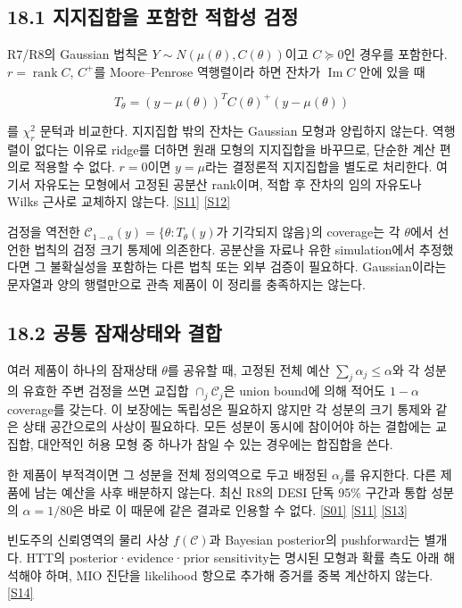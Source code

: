 \documentclass[11pt,a4paper]{article}
\begin{document}
\subsection*{18.1 지지집합을 포함한 적합성 검정}

R7/R8의 Gaussian 법칙은 \(Y\sim N(\mu(\theta),C(\theta))\)이고 \(C\succeq0\)인 경우를 포함한다. \(r=\operatorname{rank}C\), \(C^+\)를 Moore–Penrose 역행렬이라 하면 잔차가 \(\operatorname{Im}C\) 안에 있을 때


\[
T_\theta=(y-\mu(\theta))^TC(\theta)^+(y-\mu(\theta))
\]

를 \(\chi^2_r\) 문턱과 비교한다. 지지집합 밖의 잔차는 Gaussian 모형과 양립하지 않는다. 역행렬이 없다는 이유로 ridge를 더하면 원래 모형의 지지집합을 바꾸므로, 단순한 계산 편의로 적용할 수 없다. \(r=0\)이면 \(y=\mu\)라는 결정론적 지지집합을 별도로 처리한다. 여기서 자유도는 모형에서 고정된 공분산 rank이며, 적합 후 잔차의 임의 자유도나 Wilks 근사로 교체하지 않는다. \hyperlink{src:S11}{[S11]} \hyperlink{src:S12}{[S12]}


검정을 역전한 \(\mathcal C_{1-\alpha}(y)=\{\theta:T_\theta(y)\text{가 기각되지 않음}\}\)의 coverage는 각 \(\theta\)에서 선언한 법칙의 검정 크기 통제에 의존한다. 공분산을 자료나 유한 simulation에서 추정했다면 그 불확실성을 포함하는 다른 법칙 또는 외부 검증이 필요하다. Gaussian이라는 문자열과 양의 행렬만으로 관측 제품이 이 정리를 충족하지는 않는다.


\subsection*{18.2 공통 잠재상태와 결합}

여러 제품이 하나의 잠재상태 \(\theta\)를 공유할 때, 고정된 전체 예산 \(\sum_j\alpha_j\le\alpha\)와 각 성분의 유효한 주변 검정을 쓰면 교집합 \(\cap_j\mathcal C_j\)은 union bound에 의해 적어도 \(1-\alpha\) coverage를 갖는다. 이 보장에는 독립성은 필요하지 않지만 각 성분의 크기 통제와 같은 상태 공간으로의 사상이 필요하다. 모든 성분이 동시에 참이어야 하는 결합에는 교집합, 대안적인 허용 모형 중 하나가 참일 수 있는 경우에는 합집합을 쓴다.


한 제품이 부적격이면 그 성분을 전체 정의역으로 두고 배정된 \(\alpha_j\)를 유지한다. 다른 제품에 남는 예산을 사후 배분하지 않는다. 최신 R8의 DESI 단독 95\% 구간과 통합 성분의 \(\alpha=1/80\)은 바로 이 때문에 같은 결과로 인용할 수 없다. \hyperlink{src:S01}{[S01]} \hyperlink{src:S11}{[S11]} \hyperlink{src:S13}{[S13]}


빈도주의 신뢰영역의 물리 사상 \(f(\mathcal C)\)과 Bayesian posterior의 pushforward는 별개다. HTT의 posterior·evidence·prior sensitivity는 명시된 모형과 확률 측도 아래 해석해야 하며, MIO 진단을 likelihood 항으로 추가해 증거를 중복 계산하지 않는다. \hyperlink{src:S14}{[S14]}
\end{document}
